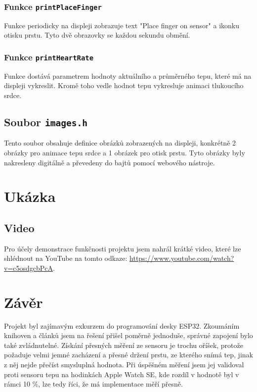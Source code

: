 \documentclass[11pt,a4paper]{article}
\begin{document}
                \subsubsection{Funkce \texttt{printPlaceFinger}}

                Funkce periodicky na displeji zobrazuje text "Place finger on sensor" a ikonku otisku prstu. Tyto dvě obrazovky
                se každou sekundu obmění.
    
                \subsubsection{Funkce \texttt{printHeartRate}}

                Funkce dostává parametrem hodnoty aktuálního a průměrného tepu, které má na displeji vykreslit. Kromě toho
                vedle hodnot tepu vykresluje animaci tlukoucího srdce.
    
            \subsection{Soubor \texttt{images.h}}

            Tento soubor obsahuje definice obrázků zobrazených na displeji, konkrétně 2 obrázky pro animace tepu srdce a 1 obrázek
            pro otisk prstu. Tyto obrázky byly nakresleny digitálně a převedeny do bajtů pomocí webového nástroje\cite{mischianti}.
            
        \section{Ukázka}
			
            \subsection{Video}

            Pro účely demonstrace funkčnosti projektu jsem nahrál krátké video, které lze shlédnout na YouTube na
            tomto odkaze: \url{https://www.youtube.com/watch?v=c5osdgcbPcA}. 
            
        \section{Závěr}

            Projekt byl zajímavým exkurzem do programování desky ESP32. Zkoumáním knihoven a článků jsem na řešení přišel
            poměrně jednoduše, správné zapojení bylo také zvládnutelné. Získání přesných měření ze sensoru je trochu oříšek,
            protože požaduje velmi jemné zacházení a přesné držení prstu, ze kterého snímá tep, jinak z něj nejde přečíst
            smysluplná hodnota. Při úspěšném měření jsem jej validoval proti sensoru tepu na hodinkách Apple Watch SE, kde
            rozdíl v hodnotě byl v rámci 10 \%, lze tedy říci, že má implementace měří přesně.
           
\end{document}
